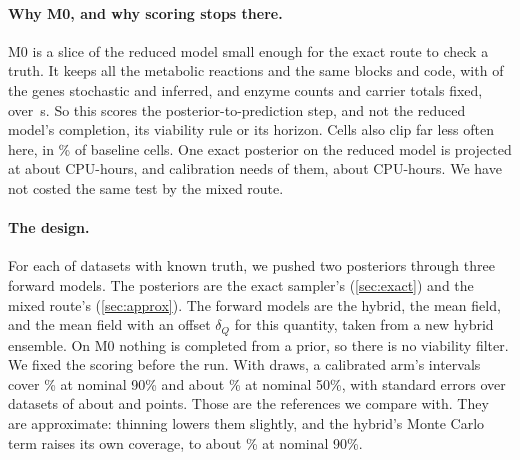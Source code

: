\paragraph{Why M0, and why scoring stops there.} M0 is a slice of the reduced model small enough for the exact route to check a truth. It keeps all the metabolic reactions and the same blocks and code, with  of the  genes stochastic and inferred, and  enzyme counts and  carrier totals fixed, over \,s. So this scores the posterior-to-prediction step, and not the reduced model's completion, its viability rule or its horizon. Cells also clip far less often here, in \% of baseline cells.
One exact posterior on the reduced model is projected at about 
CPU-hours, and calibration needs  of them, about  CPU-hours. We have not costed the same test by the mixed route.

\paragraph{The design.} For each of  datasets with known truth, we pushed
two posteriors through three forward models. The posteriors are the exact sampler's
(\cref{sec:exact}) and the mixed route's (\cref{sec:approx}). The forward models are the
hybrid, the mean field, and the mean field with an offset $\delta_Q$ for this quantity, taken from a new hybrid ensemble. On M0 nothing is completed from a prior, so there is
no viability filter. We fixed the scoring before the run. With  draws, a
calibrated arm's intervals cover \% at nominal 90\% and about
\% at nominal 50\%, with standard errors over  datasets of
about  and  points. Those are the references we compare with. They are approximate: thinning lowers them slightly, and the hybrid's Monte Carlo term raises its own coverage, to about \% at nominal 90\%.

